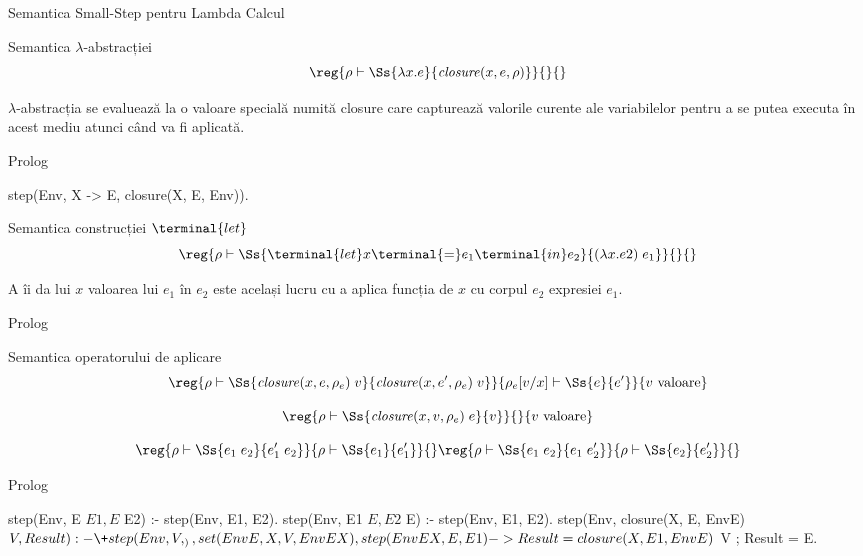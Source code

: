 \documentclass[xcolor=x11names,compress,10pt]{beamer}
\begin{document}
\begin{section}{Semantica Small-Step pentru Lambda Calcul}
\begin{frame}[fragile]{Semantica $\lambda$-abstracției}
	\[\reg{\rho \vdash \Ss{\lambda x. e}{{\it closure}(x, e, \rho)}}{}{}\]

  $\lambda$-abstracția se evaluează la o valoare specială numită closure
  care capturează valorile curente ale variabilelor pentru a se putea
  executa în acest mediu atunci când va fi aplicată.

  \begin{block}{Prolog}
    \begin{asciipl}
      step(Env, X -> E, closure(X, E, Env)).
    \end{asciipl}
  \end{block}

\end{frame}

\begin{frame}[fragile]{Semantica construcției $\terminal{let}$}
	\[\reg{\rho \vdash \Ss{\terminal{let} x \terminal{=} e_1 \terminal{in} e_2}{(\lambda x . e2)\; e_1}}{}{}\]

  A îi da lui $x$ valoarea lui $e_1$ în $e_2$ este același lucru cu a
  aplica funcția de $x$ cu corpul $e_2$ expresiei $e_1$.

  \begin{block}{Prolog}
  \end{block}

\end{frame}


\begin{frame}[fragile]{Semantica operatorului de aplicare}
	\[\reg{\rho \vdash \Ss{{\it closure}(x, e, \rho_e) \; v}{{\it closure}(x, e', \rho_e) \; v}}{\rho_e[v/x]\vdash \Ss{e}{e'}}{v \mbox{ valoare}}\]

	\[\reg{\rho \vdash \Ss{{\it closure}(x, v, \rho_e) \; e}{v}}{}{v \mbox{ valoare}}\]

  \[\reg{\rho \vdash \Ss{e_1 \; e_2}{e'_1 \; e_2}}{\rho \vdash \Ss{e_1}{e'_1}}{}
    \hfill
    \reg{\rho \vdash \Ss{e_1 \; e_2}{e_1 \; e'_2}}{\rho \vdash \Ss{e_2}{e'_2}}{}
    \]

  \begin{block}{Prolog}
    \begin{asciipl}
      step(Env, E $ E1, E $ E2) :- step(Env, E1, E2).
      step(Env, E1 $ E, E2 $ E) :- step(Env, E1, E2).
      step(Env, closure(X, E, EnvE) $ V, Result) :-
          \+ step(Env, V, _),
          set(EnvE, X, V, EnvEX),
          step(EnvEX, E, E1)
          ->  Result = closure(X, E1, EnvE) $ V
          ;   Result = E.
    \end{asciipl}
  \end{block}

\end{frame}

\end{section}
\end{document}
